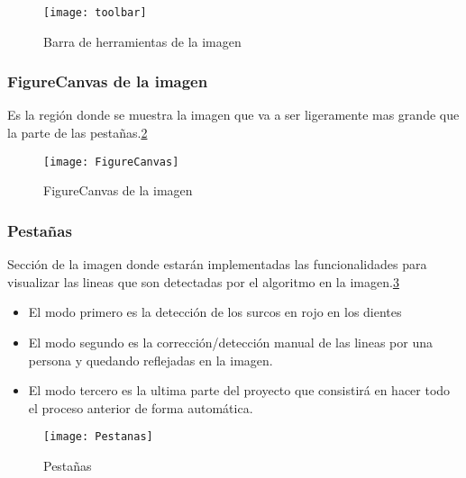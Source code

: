 \begin{figure}[h]
\centering
\texttt{[image: toolbar]}
\caption{Barra de herramientas de la imagen}\label{fig:5.11}
\end{figure}


\subsubsection{FigureCanvas de la imagen}
Es la región donde se muestra la imagen que va a ser ligeramente mas grande que la parte de las pestañas.\ref{fig:5.12}
\begin{figure}[h]
\centering
\texttt{[image: FigureCanvas]}
\caption{FigureCanvas de la imagen}
\label{fig:5.12}
\end{figure}


\subsubsection{Pestañas}
Sección de la imagen donde estarán implementadas las funcionalidades para visualizar las lineas que son detectadas por el algoritmo en la imagen.\ref{fig:5.13}
\begin{itemize}
\item El modo primero es la detección de los surcos en rojo en los dientes 
\item El modo segundo es la corrección/detección manual de las lineas por una persona y quedando reflejadas en la imagen.
\item El modo tercero es la ultima parte del proyecto que consistirá en hacer todo el proceso anterior de forma automática.
\end{itemize}

\begin{figure}[h]
\centering
\texttt{[image: Pestanas]}
\caption{Pestañas}
\label{fig:5.13}
\end{figure}

